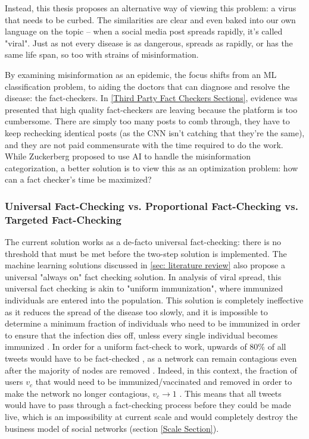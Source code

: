 \documentclass[preprint,review,12pt]{elsarticle}
\begin{document}
 Instead, this thesis proposes an alternative way of viewing this problem: a virus that needs to be curbed. The similarities are clear and even baked into our own language on the topic -- when a social media post spreads rapidly, it's called "viral". Just as not every disease is as dangerous, spreads as rapidly, or has the same life span, so too with strains of misinformation.
 
 By examining misinformation as an epidemic, the focus shifts from an ML classification problem, to aiding the doctors that can diagnose and resolve the disease: the fact-checkers. In \ref{Third Party Fact Checkers Sections}, evidence was presented that high quality fact-checkers are leaving because the platform is too cumbersome. There are simply too many posts to comb through, they have to keep rechecking identical posts (as the CNN isn't catching that they're the same), and they are not paid commensurate with the time required to do the work. While Zuckerberg proposed to use AI to handle the misinformation categorization, a better solution is to view this as an optimization problem: how can a fact checker's time be maximized? 
 
 \subsubsection{Universal Fact-Checking vs. Proportional Fact-Checking vs. Targeted Fact-Checking}
 The current solution works as a de-facto universal fact-checking: there is no threshold that must be met before the two-step solution is implemented. The machine learning solutions discussed in \ref{sec: literature review} also propose a universal "always on" fact checking solution. In analysis of viral spread, this universal fact checking is akin to "uniform immunization", where immunized individuals are entered into the population. This solution is completely ineffective as it reduces the spread of the disease too slowly, and it is impossible to determine a minimum fraction of individuals who need to be immunized in order to ensure that the infection dies off, unless every single individual becomes immunized \cite{pastor2002epidemic,pastor2002immunization,anderson1992infectious}. In order for a uniform fact-check to work, upwards of 80\% of all tweets would have to be fact-checked \cite{may1984spatial,hethcote2014gonorrhea,hethcote2013modeling,hethcote1987epidemiological,albert2000error, pastor2001epidemic}, as a network can remain contagious even after the majority of nodes are removed \cite{cohen2000resilience}. Indeed, in this context, the fraction of users $v_c$ that would need to be immunized/vaccinated and removed in order to make the network no longer contagious, $v_c \rightarrow 1$ \cite{cohen2003efficient,strogatz2001exploring,albert2002statistical,dorogovtsev2002evolution,pastor2002immunization}.
 This means that all tweets would have to pass through a fact-checking process before they could be made live, which is an impossibility at current scale and would completely destroy the business model of social networks (section \ref{Scale Section}).
 
\end{document}

